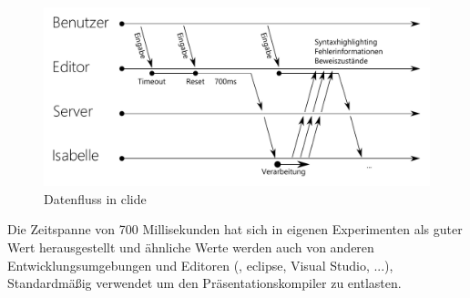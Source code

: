 \begin{figure}[ht]
\includegraphics[width=\linewidth]{images/diagram-workflow}
  \caption{Datenfluss in clide}  
  \label{fig:diagram-workflow}
\end{figure}

Die Zeitspanne von 700 Millisekunden hat sich in eigenen Experimenten als guter Wert herausgestellt
und ähnliche Werte werden auch von anderen Entwicklungsumgebungen und Editoren (, eclipse,
Visual Studio, ...), Standardmäßig verwendet um den Präsentationskompiler zu entlasten.


